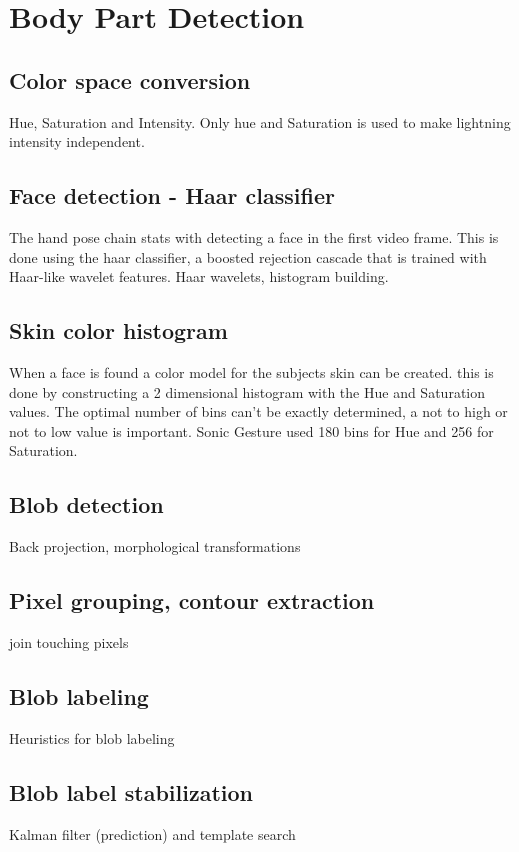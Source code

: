 \chapter{Body Part Detection}
\label{ch:bodyparts}

\section{Color space conversion}
Hue, Saturation and Intensity. Only hue and Saturation is used to make lightning intensity independent.

\section{Face detection - Haar classifier}
The hand pose chain stats with detecting a face in the first video frame. This is done using the haar classifier, a  boosted rejection cascade that is trained with Haar-like wavelet features\cite{Lienhart02anextended}.
Haar wavelets, histogram building.

\section{Skin color histogram}
When a face is found a color model for the subjects skin can be created. this is done by constructing a 2 dimensional histogram with the Hue and Saturation values. The optimal number of bins can't be exactly determined, a not to high or not to low value is important. 
Sonic Gesture used 180 bins for Hue and 256 for Saturation. 

\section{Blob detection}
Back projection, morphological transformations

\section{Pixel grouping, contour extraction}
join touching pixels

\section{Blob labeling}
Heuristics for blob labeling

\section{Blob label stabilization}
Kalman filter (prediction) and template search
